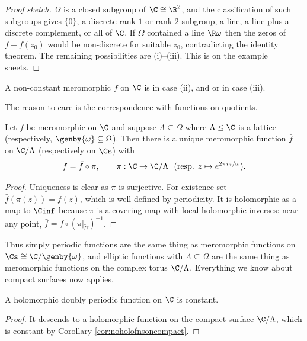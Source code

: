 \begin{proof}[Proof sketch]
	$\Omega$ is a closed subgroup of $\C \cong \R^2$, and the classification of such
	subgroups gives $\{0\}$, a discrete rank-$1$ or rank-$2$ subgroup, a line, a line plus a
	discrete complement, or all of $\C$. If $\Omega$ contained a line $\R\omega$ then the
	zeros of $f - f(z_0)$ would be non-discrete for suitable $z_0$, contradicting the
	identity theorem. The remaining possibilities are (i)--(iii). This is on the example
	sheets.
\end{proof}

\begin{definition}
	A non-constant meromorphic $f$ on $\C$ is  in case (ii), and
	 or  in case (iii).
\end{definition}

The reason to care is the correspondence with functions on quotients.

\begin{proposition}\label{prop:descend}
	Let $f$ be meromorphic on $\C$ and suppose $\Lambda \subseteq \Omega$ where
	$\Lambda \le \C$ is a lattice (respectively, $\genby{\omega} \subseteq \Omega$). Then
	there is a unique meromorphic function $\bar f$ on $\C/\Lambda$ (respectively on $\Cs$)
	with
	$$
	f = \bar f \circ \pi, \qquad \pi : \C \to \C/\Lambda \ \ (\text{resp. } z \mapsto e^{2\pi i z/\omega}).
	$$
\end{proposition}

\begin{proof}
	Uniqueness is clear as $\pi$ is surjective. For existence set $\bar f(\pi(z)) = f(z)$,
	which is well defined by periodicity. It is holomorphic as a map to $\Cinf$ because
	$\pi$ is a covering map with local holomorphic inverses: near any point,
	$\bar f = f \circ (\pi|_{\tilde U})^{-1}$.
\end{proof}

Thus simply periodic functions are the same thing as meromorphic functions on
$\Cs \cong \C/\genby{\omega}$, and elliptic functions with $\Lambda \subseteq \Omega$ are
the same thing as meromorphic functions on the complex torus $\C/\Lambda$. Everything we
know about compact surfaces now applies.

\begin{corollary}
	A holomorphic doubly periodic function on $\C$ is constant.
\end{corollary}

\begin{proof}
	It descends to a holomorphic function on the compact surface $\C/\Lambda$, which is
	constant by Corollary \ref{cor:noholofnsoncompact}.
\end{proof}

